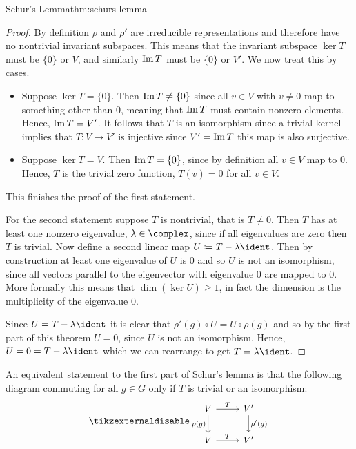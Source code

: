 \begin{thm}{Schur's Lemma}{thm:schurs lemma}
\begin{proof}
        By definition \(\rho\) and \(\rho'\) are irreducible representations
        and therefore have no nontrivial invariant subspaces.
        This means that the invariant subspace \(\ker T\) must be \(\{0\}\)
        or \(V\), and similarly \(\operatorname{Im} T\) must be \(\{0\}\) or \(V'\).
        We now treat this by cases.
        \begin{itemize}
            \item Suppose \(\ker T = \{0\}\).
            Then \(\operatorname{Im} T \ne \{0\}\) since all \(v \in V\) with \(v \ne
            0\) map to something other than \(0\), meaning that \(\operatorname{Im} T\) must contain
            nonzero elements.
            Hence, \(\operatorname{Im} T = V'\).
            It follows that \(T\) is an isomorphism since a trivial kernel
            implies that \(T \colon V \to V'\) is injective since \(V' = \operatorname{Im} T\) this map
            is also surjective.
            \item Suppose \(\ker T = V\).
            Then \(\operatorname{Im} T = \{0\}\), since by definition all \(v \in V\)
            map to \(0\).
            Hence, \(T\) is the trivial zero function, \(T(v) = 0\) for all
            \(v \in V\).
        \end{itemize}
        This finishes the proof of the first statement.
        
        For the second statement suppose \(T\) is nontrivial, that is \(T
        \ne 0\).
        Then \(T\) has at least one nonzero eigenvalue, \(\lambda \in
        \complex\), since if all eigenvalues are zero then \(T\) is trivial.
        Now define a second linear map \(U \coloneqq T - \lambda\ident\).
        Then by construction at least one eigenvalue of \(U\) is 0 and so
        \(U\) is not an isomorphism, since all vectors parallel to the eigenvector with
        eigenvalue 0 are mapped to 0.
        More formally this means that \(\dim(\ker U) \ge 1\), in fact the
        dimension is the multiplicity of the eigenvalue 0.
        
        Since \(U = T - \lambda \ident\) it is clear that \(\rho'(g) \circ U
        = U \circ \rho(g)\) and so by the first part of this theorem \(U = 0\), since
        \(U\) is not an isomorphism.
        Hence, \(U = 0 = T - \lambda \ident\) which we can rearrange to get
        \(T = \lambda \ident\).
    \end{proof}
\end{thm}

An equivalent statement to the first part of Schur's lemma is that the
following diagram commuting for all \(g \in G\) only if \(T\) is trivial or an
isomorphism:
\begin{equation}
    \tikzexternaldisable
    \begin{tikzcd}
        V \ar[r, "T"]\ar[d, "\rho(g)"'] & V' \ar[d, "\rho'(g)"]\\
        V \ar[r, "T"]& V'
    \end{tikzcd}
\end{equation}

